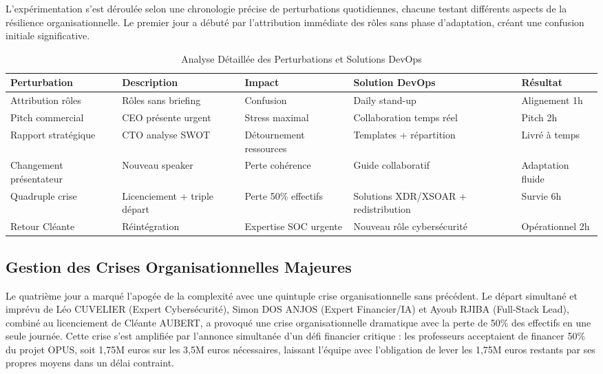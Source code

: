 \documentclass[12pt,a4paper]{article}
\begin{document}
L'expérimentation s'est déroulée selon une chronologie précise de perturbations quotidiennes, chacune testant différents aspects de la résilience organisationnelle. Le premier jour a débuté par l'attribution immédiate des rôles sans phase d'adaptation, créant une confusion initiale significative.

\begin{table}[H]
\centering
\caption{Analyse Détaillée des Perturbations et Solutions DevOps}
\begin{tabular}{|p{2.5cm}|p{2.5cm}|p{2cm}|p{3cm}|p{3cm}|}
\hline
\textbf{Perturbation} & \textbf{Description} & \textbf{Impact} & \textbf{Solution DevOps} & \textbf{Résultat} \\
\hline
Attribution rôles & Rôles sans briefing & Confusion & Daily stand-up & Alignement 1h \\
\hline
Pitch commercial & CEO présente urgent & Stress maximal & Collaboration temps réel & Pitch 2h \\
\hline
Rapport stratégique & CTO analyse SWOT & Détournement ressources & Templates + répartition & Livré à temps \\
\hline
Changement présentateur & Nouveau speaker & Perte cohérence & Guide collaboratif & Adaptation fluide \\
\hline
Quadruple crise & Licenciement + triple départ & Perte 50\% effectifs & Solutions XDR/XSOAR + redistribution & Survie 6h \\
\hline
Retour Cléante & Réintégration & Expertise SOC urgente & Nouveau rôle cybersécurité & Opérationnel 2h \\
\hline
\end{tabular}
\end{table}

\subsection{Gestion des Crises Organisationnelles Majeures}

Le quatrième jour a marqué l'apogée de la complexité avec une quintuple crise organisationnelle sans précédent. Le départ simultané et imprévu de Léo CUVELIER (Expert Cybersécurité), Simon DOS ANJOS (Expert Financier/IA) et Ayoub RJIBA (Full-Stack Lead), combiné au licenciement de Cléante AUBERT, a provoqué une crise organisationnelle dramatique avec la perte de 50\% des effectifs en une seule journée. Cette crise s'est amplifiée par l'annonce simultanée d'un défi financier critique : les professeurs acceptaient de financer 50\% du projet OPUS, soit 1,75M euros sur les 3,5M euros nécessaires, laissant l'équipe avec l'obligation de lever les 1,75M euros restants par ses propres moyens dans un délai contraint.
\end{document}
